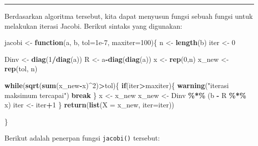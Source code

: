 \documentclass[
]{book}
\newenvironment{Shaded}{\begin{snugshade}}{\end{snugshade}}
\newcommand{\AttributeTok}[1]{\textcolor[rgb]{0.13,0.29,0.53}{#1}}
\newcommand{\ControlFlowTok}[1]{\textcolor[rgb]{0.13,0.29,0.53}{\textbf{#1}}}
\newcommand{\DecValTok}[1]{\textcolor[rgb]{0.00,0.00,0.81}{#1}}
\newcommand{\FloatTok}[1]{\textcolor[rgb]{0.00,0.00,0.81}{#1}}
\newcommand{\FunctionTok}[1]{\textcolor[rgb]{0.13,0.29,0.53}{\textbf{#1}}}
\newcommand{\NormalTok}[1]{#1}
\newcommand{\OtherTok}[1]{\textcolor[rgb]{0.56,0.35,0.01}{#1}}
\newcommand{\SpecialCharTok}[1]{\textcolor[rgb]{0.81,0.36,0.00}{\textbf{#1}}}
\newcommand{\StringTok}[1]{\textcolor[rgb]{0.31,0.60,0.02}{#1}}
\theoremstyle{definition}
\theoremstyle{definition}
\theoremstyle{definition}
\theoremstyle{definition}
\theoremstyle{remark}
\begin{document}
\begin{center}\rule{0.5\linewidth}{0.5pt}\end{center}

Berdasarkan algoritma tersebut, kita dapat menyusun fungsi sebuah fungsi untuk melakukan iterasi Jacobi. Berikut sintaks yang digunakan:

\begin{Shaded}
\begin{Highlighting}[]
\NormalTok{jacobi }\OtherTok{\textless{}{-}} \ControlFlowTok{function}\NormalTok{(a, b, }\AttributeTok{tol=}\FloatTok{1e{-}7}\NormalTok{, }\AttributeTok{maxiter=}\DecValTok{100}\NormalTok{)\{}
\NormalTok{  n }\OtherTok{\textless{}{-}} \FunctionTok{length}\NormalTok{(b)}
\NormalTok{  iter }\OtherTok{\textless{}{-}} \DecValTok{0}
  
\NormalTok{  Dinv }\OtherTok{\textless{}{-}} \FunctionTok{diag}\NormalTok{(}\DecValTok{1}\SpecialCharTok{/}\FunctionTok{diag}\NormalTok{(a))}
\NormalTok{  R }\OtherTok{\textless{}{-}}\NormalTok{ a}\SpecialCharTok{{-}}\FunctionTok{diag}\NormalTok{(}\FunctionTok{diag}\NormalTok{(a))}
\NormalTok{  x }\OtherTok{\textless{}{-}} \FunctionTok{rep}\NormalTok{(}\DecValTok{0}\NormalTok{,n)}
\NormalTok{  x\_new }\OtherTok{\textless{}{-}} \FunctionTok{rep}\NormalTok{(tol, n)}
  
  \ControlFlowTok{while}\NormalTok{(}\FunctionTok{sqrt}\NormalTok{(}\FunctionTok{sum}\NormalTok{(x\_new}\SpecialCharTok{{-}}\NormalTok{x)}\SpecialCharTok{\^{}}\DecValTok{2}\NormalTok{)}\SpecialCharTok{\textgreater{}}\NormalTok{tol)\{}
            \ControlFlowTok{if}\NormalTok{(iter}\SpecialCharTok{\textgreater{}}\NormalTok{maxiter)\{}
              \FunctionTok{warning}\NormalTok{(}\StringTok{"iterasi maksimum tercapai"}\NormalTok{)}
              \ControlFlowTok{break}
\NormalTok{            \}}
\NormalTok{            x }\OtherTok{\textless{}{-}}\NormalTok{ x\_new}
\NormalTok{            x\_new }\OtherTok{\textless{}{-}}\NormalTok{ Dinv }\SpecialCharTok{\%*\%}\NormalTok{ (b }\SpecialCharTok{{-}}\NormalTok{ R }\SpecialCharTok{\%*\%}\NormalTok{ x)}
\NormalTok{            iter }\OtherTok{\textless{}{-}}\NormalTok{ iter}\SpecialCharTok{+}\DecValTok{1}
\NormalTok{  \}}
  \FunctionTok{return}\NormalTok{(}\FunctionTok{list}\NormalTok{(}\AttributeTok{X =}\NormalTok{ x\_new, }\AttributeTok{iter=}\NormalTok{iter))}
  
\NormalTok{\}}
\end{Highlighting}
\end{Shaded}

Berikut adalah penerpan fungsi \texttt{jacobi()} tersebut:
\end{document}
